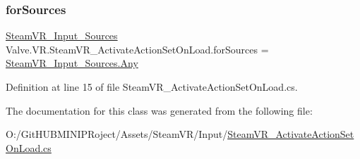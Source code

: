 \subsubsection{\texorpdfstring{forSources}{forSources}}
{\footnotesize\ttfamily \mbox{\hyperlink{namespace_valve_1_1_v_r_a82e5bf501cc3aa155444ee3f0662853f}{Steam\+V\+R\+\_\+\+Input\+\_\+\+Sources}} Valve.\+V\+R.\+Steam\+V\+R\+\_\+\+Activate\+Action\+Set\+On\+Load.\+for\+Sources = \mbox{\hyperlink{namespace_valve_1_1_v_r_a82e5bf501cc3aa155444ee3f0662853faed36a1ef76a59ee3f15180e0441188ad}{Steam\+V\+R\+\_\+\+Input\+\_\+\+Sources.\+Any}}}



Definition at line 15 of file Steam\+V\+R\+\_\+\+Activate\+Action\+Set\+On\+Load.\+cs.



The documentation for this class was generated from the following file\+:\begin{DoxyCompactItemize}
\item 
O\+:/\+Git\+H\+U\+B\+M\+I\+N\+I\+P\+Roject/\+Assets/\+Steam\+V\+R/\+Input/\mbox{\hyperlink{_steam_v_r___activate_action_set_on_load_8cs}{Steam\+V\+R\+\_\+\+Activate\+Action\+Set\+On\+Load.\+cs}}\end{DoxyCompactItemize}
